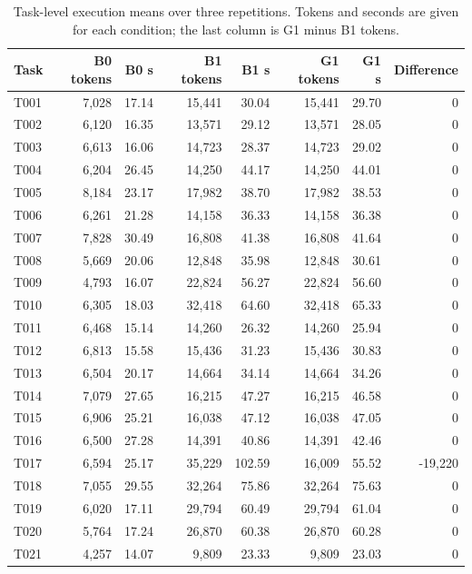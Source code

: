 \begin{table}[!p]
\centering
\footnotesize
\caption[Per-task execution means]{Task-level execution means over three repetitions. Tokens and seconds are given for each condition; the last column is G1 minus B1 tokens.}\label{tab:per-task-execution}
\begin{tabular}{lrrrrrrr}
\toprule
Task & B0 tokens & B0 s & B1 tokens & B1 s & G1 tokens & G1 s & Difference \\
\midrule
T001 & 7,028 & 17.14 & 15,441 & 30.04 & 15,441 & 29.70 & 0 \\
T002 & 6,120 & 16.35 & 13,571 & 29.12 & 13,571 & 28.05 & 0 \\
T003 & 6,613 & 16.06 & 14,723 & 28.37 & 14,723 & 29.02 & 0 \\
T004 & 6,204 & 26.45 & 14,250 & 44.17 & 14,250 & 44.01 & 0 \\
T005 & 8,184 & 23.17 & 17,982 & 38.70 & 17,982 & 38.53 & 0 \\
T006 & 6,261 & 21.28 & 14,158 & 36.33 & 14,158 & 36.38 & 0 \\
T007 & 7,828 & 30.49 & 16,808 & 41.38 & 16,808 & 41.64 & 0 \\
T008 & 5,669 & 20.06 & 12,848 & 35.98 & 12,848 & 30.61 & 0 \\
T009 & 4,793 & 16.07 & 22,824 & 56.27 & 22,824 & 56.60 & 0 \\
T010 & 6,305 & 18.03 & 32,418 & 64.60 & 32,418 & 65.33 & 0 \\
T011 & 6,468 & 15.14 & 14,260 & 26.32 & 14,260 & 25.94 & 0 \\
T012 & 6,813 & 15.58 & 15,436 & 31.23 & 15,436 & 30.83 & 0 \\
T013 & 6,504 & 20.17 & 14,664 & 34.14 & 14,664 & 34.26 & 0 \\
T014 & 7,079 & 27.65 & 16,215 & 47.27 & 16,215 & 46.58 & 0 \\
T015 & 6,906 & 25.21 & 16,038 & 47.12 & 16,038 & 47.05 & 0 \\
T016 & 6,500 & 27.28 & 14,391 & 40.86 & 14,391 & 42.46 & 0 \\
T017 & 6,594 & 25.17 & 35,229 & 102.59 & 16,009 & 55.52 & -19,220 \\
T018 & 7,055 & 29.55 & 32,264 & 75.86 & 32,264 & 75.63 & 0 \\
T019 & 6,020 & 17.11 & 29,794 & 60.49 & 29,794 & 61.04 & 0 \\
T020 & 5,764 & 17.24 & 26,870 & 60.38 & 26,870 & 60.28 & 0 \\
T021 & 4,257 & 14.07 & 9,809 & 23.33 & 9,809 & 23.03 & 0 \\

\end{tabular}
\end{table}
